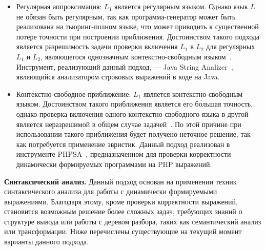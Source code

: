 \begin{itemize}
    \item Регулярная аппроксимация: $L_1$ является регулярным языком. Однако язык $L$ не обязан быть регулярным, так как программа-генератор может быть реализована на тьюринг-полном языке, что может приводить к существенной потере точности при построении приближения. Достоинством такого подхода является разрешимость задачи проверки включения $L_1$ в $L_2$ для регулярных $L_1$ и $L_2$, являющегося однозначным контекстно-свободным языком~\cite{LangIncusion}. Инструмент, реализующий данный подход, --- Java String Analizer~\cite{JSA}, являющийся анализатором строковых выражений в коде на Java.

    \item Контекстно-свободное приближение: $L_1$ является контекстно-свободным языком.  Достоинством такого приближения является его б\'{о}льшая точность, однако проверка включения одного контекстно-свободного языка в другой является неразрешимой в общем случае задачей~\cite{LangIncusion}. По  этой причине при использовании такого приближения будет получено неточное решение, так как потребуется применение эвристик. Данный подход реализован в инструменте PHPSA~\cite{PHPSA}, предназначенном для проверки корректности динамически формируемых программами на PHP выражений.

\end{itemize}

\textbf{Синтаксический анализ.} Данный подход основан на применении техник синтаксического анализа для работы с динамически формируемыми выражениями. Благодаря этому, кроме проверки корректности выражений, становится возможным решение более сложных задач, требующих знаний о структуре вывода или работы с деревом разбора, таких как семантический анализ или трансформации. Ниже перечислены существующие на текущий момент варианты данного подхода.

